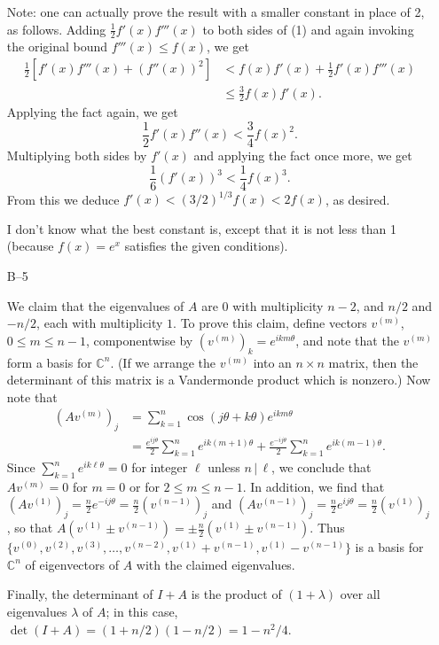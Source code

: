 \documentclass[amssymb,twocolumn,pra,10pt,aps]{revtex4-1}
\newcommand{\CC}{\mathbb{C}}
\begin{document}
\begin{itemize}
Note: one can actually prove the result with a smaller constant in place of
2, as follows. Adding $\frac{1}{2} f'(x) f'''(x)$ to both sides
of (1) and again invoking the original bound
$f'''(x) \leq f(x)$, we get
\begin{align*}
\frac{1}{2} [f'(x) f'''(x) + (f''(x))^2] &< f(x) f'(x) + \frac{1}{2} f'(x) f'''(x) \\
&\leq \frac{3}{2} f(x) f'(x).
\end{align*}
Applying the fact again, we get
\[
\frac{1}{2} f'(x) f''(x) < \frac{3}{4} f(x)^2.
\]
Multiplying both sides by $f'(x)$ and applying the fact once more, we get
\[
\frac{1}{6} (f'(x))^3 < \frac{1}{4} f(x)^3.
\]
From this we deduce $f'(x) < (3/2)^{1/3} f(x) < 2f(x)$, as desired.

I don't know what the best constant is, except that it is not less than 1
(because $f(x) = e^x$ satisfies the given conditions).

\item[B--5]

We claim that the eigenvalues of $A$ are $0$ with multiplicity $n-2$,
and $n/2$ and $-n/2$, each with multiplicity $1$.  To prove this claim,
define vectors $v^{(m)}$, $0\leq m\leq n-1$, componentwise by
$(v^{(m)})_k = e^{ikm\theta}$, and note that the $v^{(m)}$ form a basis
for $\CC^n$.  (If we arrange the $v^{(m)}$ into an $n\times n$ matrix,
then the determinant of this matrix is a Vandermonde product which is
nonzero.)  Now note that
\begin{align*}
(Av^{(m)})_j &= \sum_{k=1}^n \cos(j\theta+k\theta) e^{ikm\theta} \\
&= \frac{e^{ij\theta}}{2} \sum_{k=1}^n e^{ik(m+1)\theta}
+ \frac{e^{-ij\theta}}{2} \sum_{k=1}^n e^{ik(m-1)\theta}.
\end{align*}
Since $\sum_{k=1}^n e^{ik\ell\theta} = 0$ for integer $\ell$ unless
$n\,|\,\ell$, we conclude that $Av^{(m)}=0$ for $m=0$ or for
$2 \leq m \leq n-1$.  In addition, we find that $(Av^{(1)})_j =
\frac{n}{2} e^{-ij\theta} = \frac{n}{2}(v^{(n-1)})_j$ and $(Av^{(n-1)})_j =
\frac{n}{2} e^{ij\theta} = \frac{n}{2}(v^{(1)})_j$, so that
$A(v^{(1)} \pm v^{(n-1)}) = \pm \frac{n}{2} (v^{(1)} \pm v^{(n-1)})$.
Thus $\{v^{(0)},v^{(2)},v^{(3)},\ldots,v^{(n-2)},
v^{(1)}+v^{(n-1)},v^{(1)}-v^{(n-1)}\}$ is a basis for $\CC^n$ of
eigenvectors of $A$ with the claimed eigenvalues.

Finally, the determinant of $I+A$ is the product of $(1+\lambda)$
over all eigenvalues $\lambda$ of $A$; in this case,
$\det (I+A) = (1+n/2)(1-n/2) = 1-n^2/4$.



\end{itemize}
\end{document}
